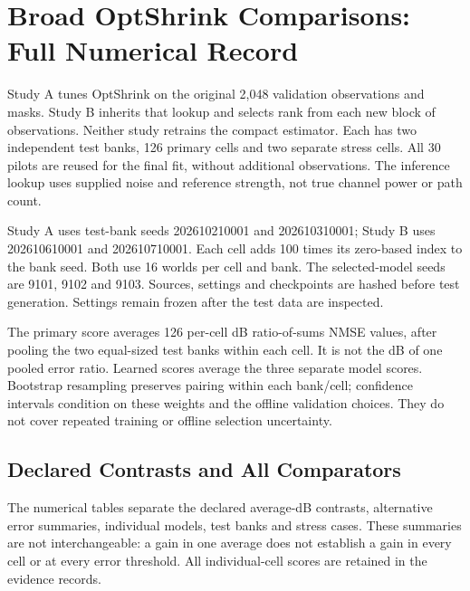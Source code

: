 \section{Broad OptShrink Comparisons: Full Numerical Record}

Study A tunes OptShrink on the original 2,048 validation observations and masks. Study B inherits that lookup and selects rank from each new block of observations. Neither study retrains the compact estimator. Each has two independent test banks, 126 primary cells and two separate stress cells. All 30 pilots are reused for the final fit, without additional observations. The inference lookup uses supplied noise and reference strength, not true channel power or path count.

Study A uses test-bank seeds 202610210001 and 202610310001; Study B uses 202610610001 and 202610710001. Each cell adds 100 times its zero-based index to the bank seed. Both use 16 worlds per cell and bank. The selected-model seeds are 9101, 9102 and 9103. Sources, settings and checkpoints are hashed before test generation. Settings remain frozen after the test data are inspected.

The primary score averages 126 per-cell dB ratio-of-sums NMSE values, after pooling the two equal-sized test banks within each cell. It is not the dB of one pooled error ratio. Learned scores average the three separate model scores. Bootstrap resampling preserves pairing within each bank/cell; confidence intervals condition on these weights and the offline validation choices. They do not cover repeated training or offline selection uncertainty.

\subsection{Declared Contrasts and All Comparators}

The numerical tables separate the declared average-dB contrasts, alternative error summaries, individual models, test banks and stress cases. These summaries are not interchangeable: a gain in one average does not establish a gain in every cell or at every error threshold. All individual-cell scores are retained in the evidence records.

